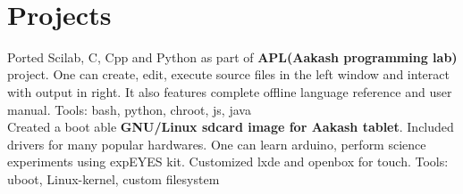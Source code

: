 \documentclass[10pt]{article} %
\begin{document}
\color{text1} %


\par{\\ %
	

\begin{minipage}[t]{0.5\textwidth} %
\vspace{0pt} %
	

\section{Projects} 


\normalsize{Ported Scilab, C, Cpp and Python as part of \textbf{APL(Aakash programming lab)} project. One can create, edit, execute source files in the left window and interact with output in right. It also features complete offline language reference and user manual. Tools: bash, python, chroot, js, java\\


Created a boot able \textbf{GNU/Linux sdcard image for Aakash tablet}. Included drivers for many popular hardwares. One can learn arduino, perform science experiments using expEYES kit. Customized lxde and openbox for touch. Tools: uboot, Linux-kernel, custom filesystem\\

}
\end{minipage}}
\end{document}
